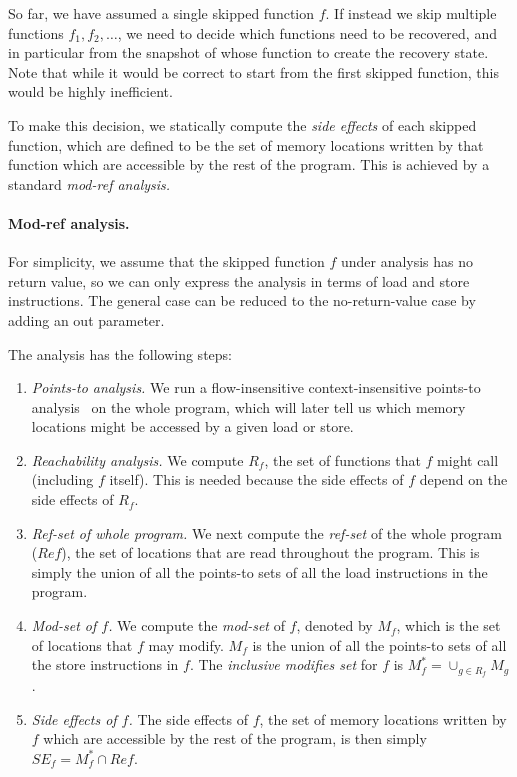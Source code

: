 So far, we have assumed a single skipped function $f$.  If instead we
skip multiple functions $f_1, f_2, \ldots$, we need to decide which
functions need to be recovered, and in particular from the snapshot of
whose function to create the recovery state.  Note that while it would
be correct to start from the first skipped function, this would be
highly inefficient.

To make this decision, we statically compute the \textit{side effects}
of each skipped function, which are defined to be the set of memory
locations written by that function which are accessible by the rest of
the program.  This is achieved by a standard \textit{mod-ref
  analysis.}

\paragraph{Mod-ref analysis.} For simplicity, we assume that the skipped
function $f$ under analysis has no return value, so we can only
express the analysis in terms of load and store instructions.  The
general case can be reduced to the no-return-value case by adding an
out parameter.

The analysis has the following steps:

\begin{enumerate}[leftmargin=*]

\item \textit{Points-to analysis. } We run a flow-insensitive
  context-insensitive points-to analysis~\cite{dragon-book} on the
  whole program, which will later tell us which memory locations might
  be accessed by a given load or store.

\item \textit{Reachability analysis.} We compute $R_f$, the set of
  functions that $f$ might call (including $f$ itself).  This is
  needed because the side effects of $f$ depend on the side effects of
  $R_f$.

\item \textit{Ref-set of whole program.}  We next compute the
  \textit{ref-set} of the whole program ($Ref$), \ie the set of
  locations that are read throughout the program.  This is simply the
  union of all the points-to sets of all the load instructions in the
  program.

\item \textit{Mod-set of $f$.}  We compute the \textit{mod-set} of
  $f$, denoted by $M_f$, which is the set of locations that $f$ may
  modify.  $M_f$ is the union of all the points-to sets of all the
  store instructions in $f$.  The \textit{inclusive modifies set} for
  $f$ is $M^{*}_f = \cup_{g \in R_f} M_g$.

\item \textit{Side effects of $f$.}  The side effects of $f$, \ie the
  set of memory locations written by $f$ which are accessible by the
  rest of the program, is then simply $SE_f = M^{*}_f \cap Ref$.

\end{enumerate}

